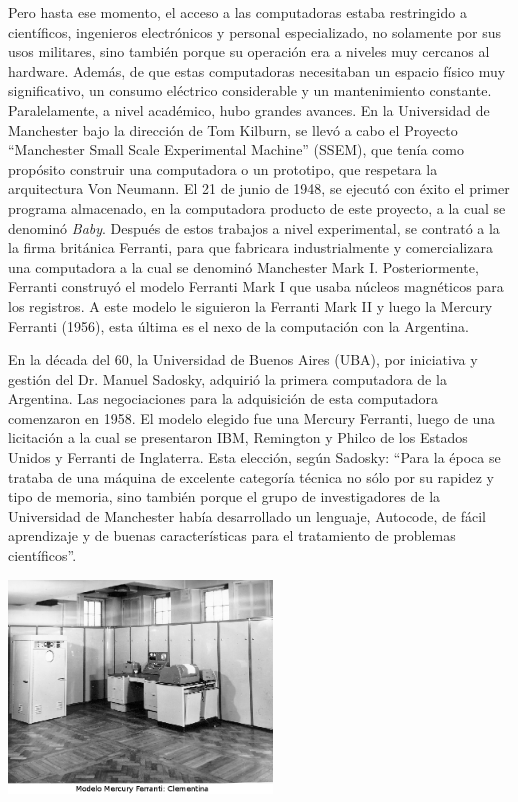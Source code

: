 \documentclass[%
  	final,
%
	notitlepage,
	narroweqnarray,
	inline,
 	twoside,
	]{ieee}
\begin{document}
Pero hasta ese momento, el acceso a las computadoras estaba restringido a cient\'ificos, ingenieros electr\'onicos y personal especializado, no solamente por sus usos militares, sino tambi\'en porque su operaci\'on era a niveles muy cercanos al hardware. Adem\'as, de que estas computadoras necesitaban un espacio f\'isico muy significativo, un consumo el\'ectrico considerable y un mantenimiento constante.
Paralelamente, a nivel acad\'emico, hubo grandes avances. En la Universidad de Manchester bajo la direcci\'on de Tom Kilburn, se llev\'o a cabo el Proyecto “Manchester Small Scale Experimental Machine” (SSEM), que ten\'ia como prop\'osito construir una computadora o un prototipo, que respetara la arquitectura Von Neumann. El 21 de junio de 1948, se ejecut\'o con \'exito el primer programa almacenado, en la computadora producto de este proyecto, a la cual se denomin\'o \textit{Baby}.
Despu\'es de estos trabajos a nivel experimental, se contrat\'o a la la firma brit\'anica Ferranti\cite{ferranti}, para que fabricara industrialmente y comercializara una computadora a la cual se denomin\'o Manchester Mark I\cite{mark1}.
Posteriormente, Ferranti construy\'o el modelo Ferranti Mark I que usaba n\'ucleos magn\'eticos para los registros. A este modelo le siguieron la Ferranti Mark II y luego la Mercury Ferranti (1956), esta \'ultima es el nexo de la computaci\'on con la Argentina.

En la d\'ecada del 60, la Universidad de Buenos Aires (UBA), por iniciativa y gesti\'on del Dr. Manuel Sadosky\cite{sadosky}, adquiri\'o la primera computadora de la Argentina.
Las negociaciones para la adquisici\'on de esta computadora comenzaron en 1958. El modelo elegido fue una Mercury Ferranti, luego de una licitaci\'on a la cual se presentaron IBM, Remington y Philco de los Estados Unidos y Ferranti de Inglaterra. Esta elecci\'on, seg\'un Sadosky: ``Para la \'epoca se trataba de una m\'aquina de excelente categor\'ia t\'ecnica no s\'olo por su rapidez y tipo de memoria, sino tambi\'en porque el grupo de investigadores de la Universidad de Manchester hab\'ia desarrollado un lenguaje, Autocode, de f\'acil aprendizaje y de buenas caracter\'isticas para el tratamiento de problemas cient\'ificos''.\\

\begin{center}\includegraphics[width=199pt, height=161pt]{clementina.png}\end{center} %
\end{document}
